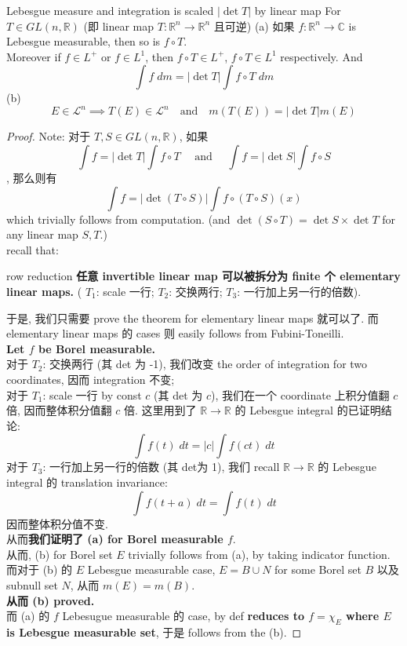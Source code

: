 \documentclass[lang=cn,11pt]{elegantbook}
\begin{document}
\begin{theorem}{Lebesgue measure and integration is scaled $|\det T|$ by linear map}
For $T \in GL(n,\mathbb{R})$ (即 linear map $T: \mathbb{R}^n \to \mathbb{R}^n$ 且可逆)
(a) 如果 $f: \mathbb{R}^n \to \mathbb{C}$ is Lebesgue measurable, then so is $f \circ T$.\\
Moreover if $f \in L^+$ or $f \in L^1$, then $f \circ T \in L^+$, $f \circ T \in L^1$ respectively. And \[
  \int f \; dm = |\det T| \int f \circ T \; dm
\]
(b) \[ E \in \mathcal{L}^n  \implies T(E) \in \mathcal{L}^n  \quad \text{and}\quad    m(T(E)) = |\det T| m(E)  \]
\end{theorem}

\begin{proof}
Note: 对于 $T,S \in GL(n,\mathbb{R})$, 如果  \[\int f  = |\det T| \int f\circ T\quad  \text{ and } \quad \int f = |\det S| \int f\circ S\]  , 那么则有 \[
\int f = |\det (T \circ S) | \int f \circ (T\circ S) (x) 
\]
which trivially follows from computation. (and $\det (S \circ T) = \det S \times \det T$ for any linear map $S,T$.)\\
recall that:
\begin{lemma}{row reduction}
\textbf{任意 invertible linear map 可以被拆分为 finite 个 elementary linear maps.} ( $T_1$: scale 一行; $T_2$:  交换两行; $T_3$:  一行加上另一行的倍数).
\end{lemma}
于是, 我们只需要 prove the theorem for elementary linear maps 就可以了. 而 elementary linear maps 的 cases 则 easily follows from Fubini-Toneilli.\\
\textbf{Let $f$ be Borel measurable.}\\
对于 $T_2$: 交换两行 (其 det 为 -1), 我们改变 the order of integration for two coordinates, 因而 integration 不变; \\
对于 $T_1$: scale 一行 by const $c$ (其 det 为 $c$), 我们在一个 coordinate 上积分值翻 $c$ 倍, 因而整体积分值翻 $c$ 倍. 这里用到了 $\mathbb{R}\to\mathbb{R}$ 的 Lebesgue integral 的已证明结论:\[
\int f(t) \; dt = |c| \int f(ct) \; dt
\]
对于 $T_3$: 一行加上另一行的倍数 (其 det为 1), 我们 recall $\mathbb{R}\to\mathbb{R}$ 的 Lebesgue integral 的 translation invariance: \[
\int f(t +a ) \; dt = \int f(t) \; dt
\]
因而整体积分值不变.\\
从而\textbf{我们证明了 (a) for Borel measurable $f$}.\\
从而, (b) for Borel set $E$ trivially follows from (a), by taking indicator function.\\
而对于 (b) 的 $E$ Lebesgue measurable case, $E = B \cup N$ for some Borel set $B$ 以及 subnull set $N$, 从而 $m(E) = m(B)$.\\
\textbf{从而 (b) proved. }\\
而 (a) 的 $f$ Lebesugue measurable 的 case, by def \textbf{reduces to $f = \chi_E$ where $E$ is Lebesgue measurable set}, 于是 follows from the (b).
\end{proof}
\end{document}

